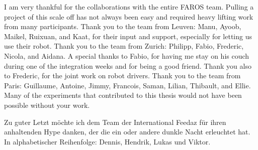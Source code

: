 

I am very thankful for the collaborations with the entire FAROS team. Pulling a project of this scale off has not always been easy and required heavy lifting work from many participants. Thank you to the team from Leuven: Manu, Ayoob, Maikel, Ruixuan, and Kaat, for their input and support, especially for letting us use their robot. Thank you to the team from Zurich: Philipp, Fabio, Frederic, Nicola, and Aidana. A special thanks to Fabio, for having me stay on his couch during one of the integration weeks and for being a good friend. Thank you also to Frederic, for the joint work on robot drivers. Thank you to the team from Paris: Guillaume, Antoine, Jimmy, Francois, Saman, Lilian, Thibault, and Ellie. Many of the experiments that contributed to this thesis would not have been possible without your work.


Zu guter Letzt möchte ich dem Team der International Feedaz für ihren anhaltenden Hype danken, der die ein oder andere dunkle Nacht erleuchtet hat. In alphabetischer Reihenfolge: Dennis, Hendrik, Lukas und Viktor.
